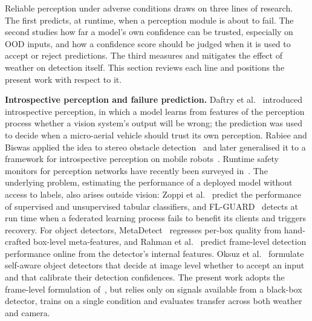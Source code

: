 \documentclass[pdflatex,sn-mathphys-num]{sn-jnl}
\begin{document}
Reliable perception under adverse conditions draws on three lines of research. The first predicts, at runtime, when a perception module is about to fail. The second studies how far a model's own confidence can be trusted, especially on OOD inputs, and how a confidence score should be judged when it is used to accept or reject predictions. The third measures and mitigates the effect of weather on detection itself. This section reviews each line and positions the present work with respect to it.

\textbf{Introspective perception and failure prediction.} Daftry et al.~\cite{daftry2016introspective} introduced introspective perception, in which a model learns from features of the perception process whether a vision system's output will be wrong; the prediction was used to decide when a micro-aerial vehicle should trust its own perception. Rabiee and Biswas applied the idea to stereo obstacle detection~\cite{rabiee2019ivoa} and later generalised it to a framework for introspective perception on mobile robots~\cite{rabiee2023introspective}. Runtime safety monitors for perception networks have recently been surveyed in~\cite{schotschneider2025runtime}. The underlying problem, estimating the performance of a deployed model without access to labels, also arises outside vision: Zoppi et al.~\cite{zoppi2025predicting} predict the performance of supervised and unsupervised tabular classifiers, and FL-GUARD~\cite{lin2024flguard} detects at run time when a federated learning process fails to benefit its clients and triggers recovery. For object detectors, MetaDetect~\cite{schubert2021metadetect} regresses per-box quality from hand-crafted box-level meta-features, and Rahman et al.~\cite{rahman2021online} predict frame-level detection performance online from the detector's internal features. Oksuz et al.~\cite{oksuz2023selfaware} formulate self-aware object detectors that decide at image level whether to accept an input and that calibrate their detection confidences. The present work adopts the frame-level formulation of~\cite{rahman2021online}, but relies only on signals available from a black-box detector, trains on a single condition and evaluates transfer across both weather and camera.
\end{document}
